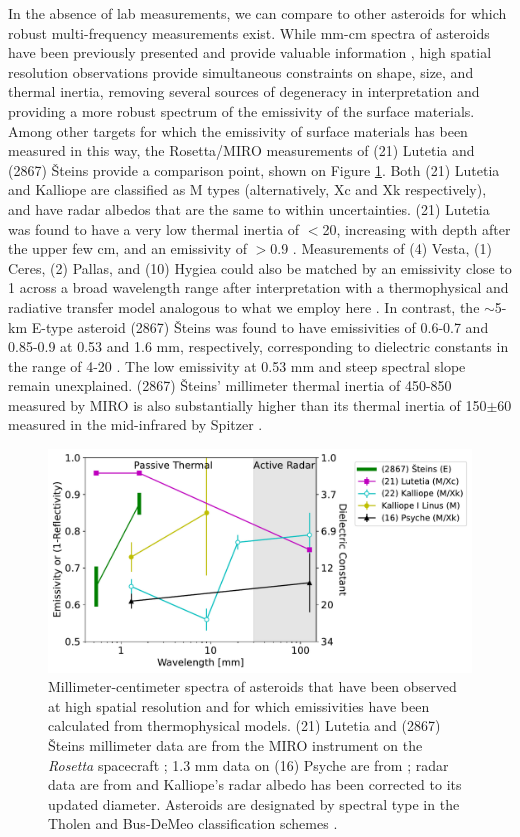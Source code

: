 \documentclass[]{aastex631}
\begin{document}
In the absence of lab measurements, we can compare to other asteroids for which robust multi-frequency measurements exist. While mm-cm spectra of asteroids have been previously presented and provide valuable information \citep{redman1992,redman1998}, high spatial resolution observations provide simultaneous constraints on shape, size, and thermal inertia, removing several sources of degeneracy in interpretation and providing a more robust spectrum of the emissivity of the surface materials. Among other targets for which the emissivity of surface materials has been measured in this way, the Rosetta/MIRO measurements of (21) Lutetia and (2867) \v{S}teins provide a comparison point, shown on Figure \ref{fig:diskintspecB}. Both (21) Lutetia and Kalliope are classified as M types (alternatively, Xc and Xk respectively), and have radar albedos that are the same to within uncertainties. (21) Lutetia was found to have a very low thermal inertia of $<$20, increasing with depth after the upper few cm, and an emissivity of $>$0.9 \citep{gulkis2012}. Measurements of (4) Vesta, (1) Ceres, (2) Pallas, and (10) Hygiea could also be matched by an emissivity close to 1 across a broad wavelength range after interpretation with a thermophysical and radiative transfer model analogous to what we employ here \citep{keihm2013}. In contrast, the $\sim$5-km E-type asteroid (2867) \v{S}teins was found to have emissivities of 0.6-0.7 and 0.85-0.9 at 0.53 and 1.6 mm, respectively, corresponding to dielectric constants in the range of 4-20 \citep{gulkis2010}. The low emissivity at 0.53 mm and steep spectral slope remain unexplained. (2867) \v{S}teins' millimeter thermal inertia of 450-850 measured by MIRO is also substantially higher than its thermal inertia of 150$\pm$60 measured in the mid-infrared by Spitzer \citep{lamy2008}. 

\begin{figure}[t!]
\centering
\includegraphics[width=0.7\linewidth]{diskintspec_may2024_multiobj.pdf}
\caption{Millimeter-centimeter spectra of asteroids that have been observed at high spatial resolution and for which emissivities have been calculated from thermophysical models. (21) Lutetia and (2867) \v{S}teins millimeter data are from the MIRO instrument on the \textit{Rosetta} spacecraft \citep{gulkis2010,gulkis2012}; 1.3 mm data on (16) Psyche are from \cite{dekleer2021}; radar data are from \cite{2007IcarMagri,shepard2015,shepard2021} and Kalliope's radar albedo has been corrected to its updated diameter. Asteroids are designated by spectral type in the Tholen and Bus-DeMeo classification schemes \citep{tholen1984,bus1999,demeo2009}.}
\label{fig:diskintspecB}
\end{figure}
\end{document}
